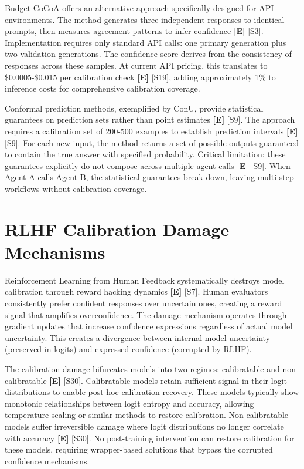 \documentclass[a4paper,11pt]{article}
\newcommand{\elabel}{\textbf{\textcolor{ecolor}{[E]}}}
\begin{document}
Budget-CoCoA offers an alternative approach specifically designed for API environments. The method generates three independent responses to identical prompts, then measures agreement patterns to infer confidence \elabel{} \textcolor{primary}{[S3]}. Implementation requires only standard API calls: one primary generation plus two validation generations. The confidence score derives from the consistency of responses across these samples. At current API pricing, this translates to \$0.0005-\$0.015 per calibration check \elabel{} \textcolor{primary}{[S19]}, adding approximately 1\% to inference costs for comprehensive calibration coverage.


Conformal prediction methods, exemplified by ConU, provide statistical guarantees on prediction sets rather than point estimates \elabel{} \textcolor{primary}{[S9]}. The approach requires a calibration set of 200-500 examples to establish prediction intervals \elabel{} \textcolor{primary}{[S9]}. For each new input, the method returns a set of possible outputs guaranteed to contain the true answer with specified probability. Critical limitation: these guarantees explicitly do not compose across multiple agent calls \elabel{} \textcolor{primary}{[S9]}. When Agent A calls Agent B, the statistical guarantees break down, leaving multi-step workflows without calibration coverage.


\section{RLHF Calibration Damage Mechanisms}

Reinforcement Learning from Human Feedback systematically destroys model calibration through reward hacking dynamics \elabel{} \textcolor{primary}{[S7]}. Human evaluators consistently prefer confident responses over uncertain ones, creating a reward signal that amplifies overconfidence. The damage mechanism operates through gradient updates that increase confidence expressions regardless of actual model uncertainty. This creates a divergence between internal model uncertainty (preserved in logits) and expressed confidence (corrupted by RLHF).


The calibration damage bifurcates models into two regimes: calibratable and non-calibratable \elabel{} \textcolor{primary}{[S30]}. Calibratable models retain sufficient signal in their logit distributions to enable post-hoc calibration recovery. These models typically show monotonic relationships between logit entropy and accuracy, allowing temperature scaling or similar methods to restore calibration. Non-calibratable models suffer irreversible damage where logit distributions no longer correlate with accuracy \elabel{} \textcolor{primary}{[S30]}. No post-training intervention can restore calibration for these models, requiring wrapper-based solutions that bypass the corrupted confidence mechanisms.
\end{document}
